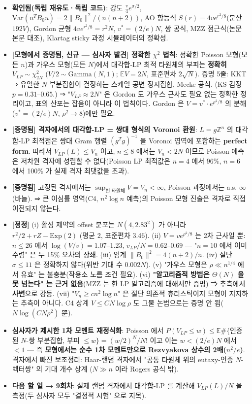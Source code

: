 \begin{itemize}
\tightlist
\item
  \textbf{확인됨(독립 재유도·독립 코드)}: 강도 \(\frac v4e^{\sigma/2}\), \(\mathrm{Var}(u^TB_0u)=2\|B_0\|^2/(n(n+2))\), AO 항등식 \(S(r)=4ve^{r^2/8}\)(분산 \(192V\)), Gordon 균형 \(4ve^{r^2/8}=r^2N\), \(v^*=(2/e)N\), 쌍 공식, MZZ 점근식(논문 본문 대조), Klartag sticky 과정 시뮬레이터의 정확성.
\item
  \textbf{{[}모형에서 증명됨, 신규 --- 심사자 발견{]} 정확한 \(\chi^2\) 법칙}: 정확한 Poisson 모형(모든 \(n\))과 가우스 모형(모든 \(N\))에서 대각합-LP 최적 타원체의 부피는 \textbf{정확히 \(V_{LP}\sim\chi^2_{2N}\)} (\(V/2\sim\mathrm{Gamma}(N,1)\); \(\mathbb EV=2N\), 표준편차 \(2\sqrt N\)). 증명 5줄: KKT ⇒ 유일한 \(N\)-부분집합이 결정하는 스케일 공변 정지집합, Mecke 공식. (KS 검정 \(p=0.31\)--\(0.65\).) ⇒ "\(V_{LP}\approx2N\)" 은 Gordon 도 가우스 근사도 필요 없는 정확한 정리이고, 표의 산포는 잡음이 아니라 이 법칙이다. Gordon 은 \(V=v^*\cdot e^{\rho^2/8}\) 의 분해(\(v^*=(2/e)N\), \(\rho^2\to8\))에만 필요.
\item
  \textbf{{[}증명됨{]} 격자에서의 대각합-LP = 쌍대 형식의 Voronoi 환원}: \(L=g\mathbb Z^n\) 의 대각합-LP 최적점은 쌍대 Gram 행렬 \((g^Tg)^{-1}\) 을 Voronoi 영역에 포함하는 \textbf{perfect form}. 따라서 \(V_{LP}(L)\le V_n\) 이고, \(n\le8\) 에서는 \(V_n<2N\) 이므로 Poisson 예측은 저차원 격자에 성립할 수 없다(Poisson LP 최적값은 \(n=4\) 에서 96\%, \(n=6\) 에서 100\% 가 실제 격자 최댓값을 초과).
\item
  \textbf{{[}증명됨{]}} 고정된 격자에서는 \(\sup_{\text{빈 타원체}}V=V_n<\infty\), Poisson 과정에서는 a.s. \(\infty\)(바늘). ⇒ 큰 이심률 영역(C4, \(n^2\log n\) 예측)의 Poisson 모형 진술은 격자로 직접 이전되지 않는다.
\item
  \textbf{{[}정정{]}} (i) 활성 제약의 offset 분포는 \(N(4,2.83^2)\) 가 아니라 \(r^2/2+rZ-\mathrm{Exp}(2)\) (평균 2, 표준편차 3.46). (ii) \(V=ve^{\rho^2/8}\) 는 2차 근사일 뿐: \(n\le26\) 에서 \(\log(V/v)=1.07\)--\(1.23\), \(v_{LP}/N=0.62\)--\(0.69\) --- "\(n=10\) 에서 이미 수렴" 은 두 15\% 오차의 상쇄. (iii) 임계 \(\|B_0\|^2=4(n+2)/n\). (iv) 절단 \(\sigma\le11\) 은 정확하지 않다(위반 기대 수 \(0.002N\)). (v) "가우스 모형은 \(\rho\ll n^{1/4}\) 에서 유효" 는 불충분(작용소 노름 조건 필요). (vi) \textbf{"알고리즘적 방법은 \(\Theta(N)\) 을 못 넘는다" 는 근거 없음}(MZZ 는 한 LP 알고리즘에 대해서만 증명) ⇒ 추측에서 \textbf{사변}으로 강등. (vii) "\(V_n\ge cn^2\log n\)" 은 절단 의존적 휴리스틱이지 모형이 지지하는 추측이 아니다. C4 상계 \(V\le CN\log\rho\) 도 그물 논법으로는 증명 안 됨(\(N\log(CN\rho^2)\) 뿐).
\item
  \textbf{심사자가 제시한 1차 모멘트 재정식화}: Poisson 에서 \(P(V_{LP}\le w)\le\mathbb E\#\{\)인증된 \(N\)-쌍 부분집합, 부피 \(\le w\}=(w/2)^N/N!\) 이고 이는 \(w<(2/e)N\) 에서 \(<1\) --- 즉 \textbf{모형에서는 순수 1차 모멘트만으로 Rezvyakova 상수의 2배(\(n^2/e\))}. 격자에서 빠진 보조정리: Haar-랜덤 격자에서 "공통 타원체 위의 eutaxy-인증 \(N\)-벡터쌍" 의 기대 개수 상계 (\(N\gg n\) 이라 Rogers 공식 밖).
\item
  \textbf{다음 할 일 → 9회차}: 실제 랜덤 격자에서 대각합-LP 를 계산해 \(V_{LP}(L)/N\) 을 측정(두 심사자 모두 "결정적 시험" 으로 지목).
\end{itemize}

